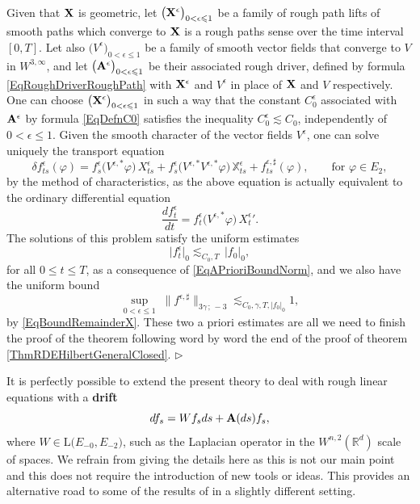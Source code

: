 \documentclass[11pt,a4paper]{amsart}
\newcommand{\RR}{\mathbb{R}}  \newcommand{\CC}{\mathbb{C}}  \newcommand{\LL}{\mathbb{L}}  \newcommand{\WW}{\mathbb{W}}
\newcommand{\bbX}{\mathbb{X}}
\renewcommand{\leq}{\leqslant}
\numberwithin{equation}{section} %
\newenvironment{Dem}{%
    \begin{list}{\hspace{0.5cm}{\sc Proof --}}{%
        \setlength{\topsep}{0pt}%
        \setlength{\leftmargin}{0pt}%
        \setlength{\rightmargin}{0pt}%
        \setlength{\listparindent}{0pt}%
        \setlength{\itemindent}{0pt}%
        \setlength{\parsep}{0pt}%
        \addtolength{\leftmargin}{20pt}%
        \addtolength{\rightmargin}{0pt}%
    } \item }{\hfill{\space $\rhd$}\end{list}\smallskip}
\begin{document}
\begin{Dem}
Given that ${\bf X}$ is geometric, let $\big({\bfX}^\epsilon\big)_{0<\epsilon\leq 1}$ be a family of rough path lifts of smooth paths which converge to ${\bf X}$ is a rough paths sense over the time interval $[0,T]$. Let also $\big(V^\epsilon\big)_{0<\epsilon\leq 1}$ be a family of smooth vector fields that converge to $V$ in $W^{3,\infty}$, and let $\big({\bf A}^\epsilon\big)_{0<\epsilon\leq 1}$ be their associated rough driver, defined by formula \eqref{EqRoughDriverRoughPath} with ${{\bf X}}^\epsilon$ and $V^\epsilon$ in place of ${\bf X}$ and $V$ respectively. One can choose $\big({\bfX}^\epsilon\big)_{0<\epsilon\leq 1}$ in such a way that the constant $C_0^\epsilon$ associated with ${\bf A}^\epsilon$ by formula \eqref{EqDefnC0} satisfies the inequality $C_0^\epsilon\lesssim C_0$, independently of $0<\epsilon\leq 1$. Given the smooth character of the vector fields $V^\epsilon$, one can solve uniquely the transport equation
\begin{equation*}
\delta f^\epsilon_{ts}(\varphi) = f^\epsilon_s\big(V^{\epsilon,\ast} \varphi\big)\,X^\epsilon_{ts} + f^\epsilon_s\big(V^{\epsilon,\ast}V^{\epsilon,\ast}\varphi\big)\,\bbX^\epsilon_{ts} + f^{\epsilon, \sharp}_{ts}(\varphi), \quad\quad \textrm{for } \varphi\in E_2,
\end{equation*}
by the method of characteristics, as the above equation is actually equivalent to the ordinary differential equation
$$ 
\frac{df^\epsilon_t}{dt} = f^\epsilon_t\big(V^{\epsilon,\ast}\varphi\big)\,{X^\epsilon_t}'.
$$
The solutions of this problem satisfy the uniform estimates
\begin{equation*}
\big| f^\epsilon_t \big|_0 \lesssim_{C_0,T}\,\big| f_0 \big|_0,
\end{equation*}
for all $0\leq t\leq T$, as a consequence of \eqref{EqAPrioriBoundNorm}, and we also have the uniform bound
\begin{equation*}
\sup_{0<\epsilon\leq 1}\;\big\| f^{\epsilon, \sharp} \big\|_{3 \gamma\,;\, - 3} \lesssim_{C_0, \gamma, T,|f_0|_0} 1,
\end{equation*}
by \eqref{EqBoundRemainderX}. These two a priori estimates are all we need to finish the proof of the theorem following word by word the end of the proof of theorem \ref{ThmRDEHilbertGeneralClosed}. 
\end{Dem}

\medskip

It is perfectly possible to extend the present theory to deal with rough linear equations with a {\bf drift}
$$
df_s = Wf_s ds + {\bf A}(ds)f_s,
$$
where $W\in\textrm{L}\big(E_{-0},E_{-2}\big)$, such as the Laplacian operator in the $W^{n,2}(\RR^d)$ scale of spaces. We refrain from giving the details here as this is not our main point and this does not require the introduction of new tools or ideas. This provides an alternative road to some of the results of \cite{DiehlFrizStannat} in a slightly different setting.
\end{document}
